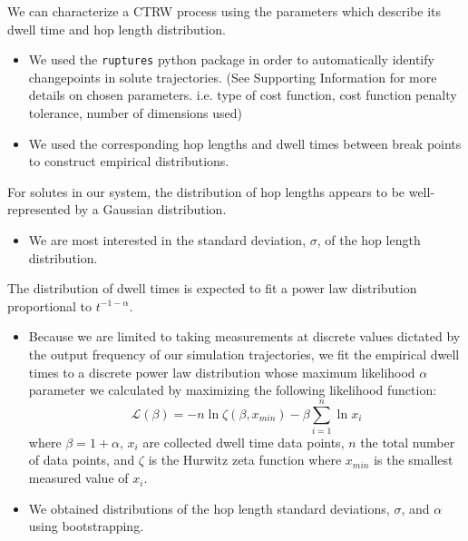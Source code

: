 \documentclass{article}
\begin{document}
  \noindent We can characterize a CTRW process using the parameters which describe its
  dwell time and hop length distribution.  %
  \begin{itemize}
	\item We used the \texttt{ruptures} python package in order to automatically identify
	changepoints in solute trajectories.\cite{truong_ruptures:_2018} (See Supporting
	Information for more details on chosen parameters. i.e. type of cost function, 
	cost function penalty tolerance, number of dimensions used)
	\item We used the corresponding hop lengths and dwell times between break points
	to construct empirical distributions.
  \end{itemize}
	
  For solutes in our system, the distribution of hop lengths appears to be
  well-represented by a Gaussian distribution.~\cite{metzler_random_2000,
  metzler_anomalous_2014,neusius_subdiffusion_2009}  %
  \begin{itemize}
	\item We are most interested in the standard deviation, $\sigma$, of the 
	hop length distribution.
  \end{itemize}
  
  \noindent The distribution of dwell times is expected to fit a power law
  distribution proportional to $t^{-1-\alpha}$.~\cite{meroz_toolbox_2015}
  \begin{itemize}
	\item Because we are limited to taking measurements at discrete values
	dictated by the output frequency of our simulation trajectories, we fit the
	empirical dwell times to a discrete power law distribution whose maximum
	likelihood $\alpha$ parameter we calculated by maximizing the following
	likelihood function: 
    \begin{equation}
	\mathcal{L}(\beta) = -n\ln \zeta(\beta, x_{min}) -
	\beta\sum_{i=1}^{n} \ln x_i 
	\label{eqn:powerlaw_likelihood}
	\end{equation}
	where $\beta = 1 + \alpha$, $x_i$ are collected dwell time data points,
	$n$ the total number of data points, and $\zeta$ is the Hurwitz zeta function
	where $x_{min}$ is the smallest measured value of
	$x_i$.~\cite{clauset_power-law_2009} 
	\item We obtained distributions of the hop length standard deviations, $\sigma$, and
	$\alpha$ using bootstrapping.\cite{efron_introduction_1994} 
  \end{itemize}
  
\end{document}

